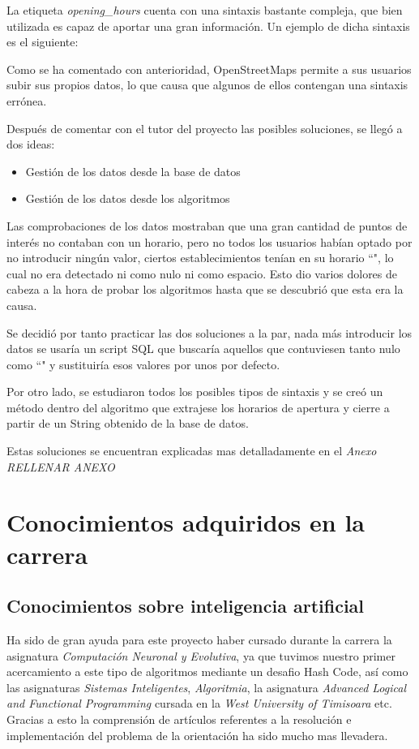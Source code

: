 La etiqueta \textit{opening\_hours} cuenta con una sintaxis bastante compleja, que bien utilizada es capaz de aportar una gran información. Un ejemplo de dicha sintaxis es el siguiente:

Como se ha comentado con anterioridad, OpenStreetMaps permite a sus usuarios subir sus propios datos, lo que causa que algunos de ellos contengan una sintaxis errónea.

Después de comentar con el tutor del proyecto las posibles soluciones, se llegó a dos ideas:
\begin{itemize}
\item Gestión de los datos desde la base de datos
\item Gestión de los datos desde los algoritmos
\end{itemize}

Las comprobaciones de los datos mostraban que una gran cantidad de puntos de interés no contaban con un horario, pero no todos los usuarios habían optado por no introducir ningún valor, ciertos establecimientos tenían en su horario ``", lo cual no era detectado ni como nulo ni como espacio. Esto dio varios dolores de cabeza a la hora de probar los algoritmos hasta que se descubrió que esta era la causa.

Se decidió por tanto practicar las dos soluciones a la par, nada más introducir los datos se usaría un script SQL que buscaría aquellos que contuviesen tanto nulo como ``" y sustituiría esos valores por unos por defecto.

Por otro lado, se estudiaron todos los posibles tipos de sintaxis y se creó un método dentro del algoritmo que extrajese los horarios de apertura y cierre a partir de un String obtenido de la base de datos.

Estas soluciones se encuentran explicadas mas detalladamente en el \textit{Anexo RELLENAR ANEXO}

\section{Conocimientos adquiridos en la carrera}
\subsection{Conocimientos sobre inteligencia artificial}
Ha sido de gran ayuda para este proyecto haber cursado durante la carrera la asignatura \textit{Computación Neuronal y Evolutiva}, ya que tuvimos nuestro primer acercamiento a este tipo de algoritmos mediante un desafio Hash Code, así como las asignaturas \textit{Sistemas Inteligentes}, \textit{Algoritmia}, la asignatura \textit{Advanced Logical and Functional Programming} cursada en la \textit{West University of Timisoara} etc.
Gracias a esto la comprensión de artículos referentes a la resolución e implementación del problema de la orientación ha sido mucho mas llevadera.

